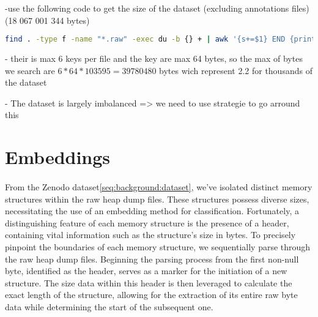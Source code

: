             -use the following code to get the size of the dataset (excluding annotations files) (18 067 001 344 bytes)
            \begin{lstlisting}[caption={Get the size of the dataset}, label=methods:code:get_dataset_size, language=bash]
                find . -type f -name "*.raw" -exec du -b {} + | awk '{s+=$1} END {print s}'
            \end{lstlisting}

            - their is max 6 keys per file and the key are max 64 bytes, so the max of bytes we search are $6 * 64 * 103595 = 39 780 480$ bytes wich represent 2.2 for thousands of the dataset

            - The dataset is largely imbalanced => we need to use strategie to go arround this

    \section{Embeddings}
        \paragraph{}From the Zenodo dataset\ref{seq:background:dataset}, we've isolated distinct memory structures within the raw heap dump files. These structures possess diverse sizes, necessitating the use of an embedding method for classification. Fortunately, a distinguishing feature of each memory structure is the presence of a header, containing vital information such as the structure's size in bytes. To precisely pinpoint the boundaries of each memory structure, we sequentially parse through the raw heap dump files. Beginning the parsing process from the first non-null byte, identified as the header, serves as a marker for the initiation of a new structure. The size data within this header is then leveraged to calculate the exact length of the structure, allowing for the extraction of its entire raw byte data while determining the start of the subsequent one.
        
